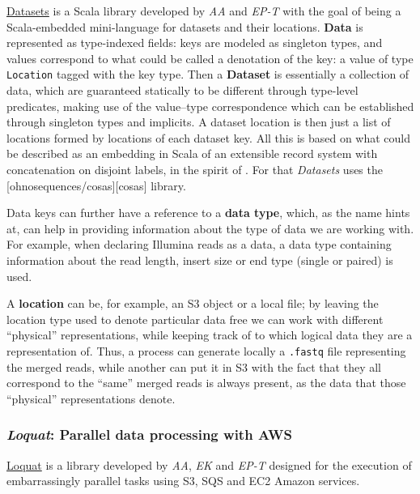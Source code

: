 \documentclass[fleqn,10pt,lineno]{wlpeerj}
\begin{document}
\protect\hyperlink{datasets}{Datasets} is a Scala library developed by
\emph{AA} and \emph{EP-T} with the goal of being a Scala-embedded
mini-language for datasets and their locations. \textbf{Data} is
represented as type-indexed fields: keys are modeled as singleton types,
and values correspond to what could be called a denotation of the key: a
value of type \texttt{Location} tagged with the key type. Then a
\textbf{Dataset} is essentially a collection of data, which are
guaranteed statically to be different through type-level predicates,
making use of the value--type correspondence which can be established
through singleton types and implicits. A dataset location is then just a
list of locations formed by locations of each dataset key. All this is
based on what could be described as an embedding in Scala of an
extensible record system with concatenation on disjoint labels, in the
spirit of \citep{harper1990extensible} \citep{harper1991record}. For
that \emph{Datasets} uses the {[}ohnosequences/cosas{]}{[}cosas{]}
library.

Data keys can further have a reference to a \textbf{data type}, which,
as the name hints at, can help in providing information about the type
of data we are working with. For example, when declaring Illumina reads
as a data, a data type containing information about the read length,
insert size or end type (single or paired) is used.

A \textbf{location} can be, for example, an S3 object or a local file;
by leaving the location type used to denote particular data free we can
work with different ``physical'' representations, while keeping track of
to which logical data they are a representation of. Thus, a process can
generate locally a \texttt{.fastq} file representing the merged reads,
while another can put it in S3 with the fact that they all correspond to
the ``same'' merged reads is always present, as the data that those
``physical'' representations denote.

\subsubsection{\texorpdfstring{\emph{Loquat}: Parallel data processing
with
AWS}{Loquat: Parallel data processing with AWS}}\label{loquat-parallel-data-processing-with-aws}

\protect\hyperlink{loquat}{Loquat} is a library developed by \emph{AA},
\emph{EK} and \emph{EP-T} designed for the execution of embarrassingly
parallel tasks using S3, SQS and EC2 Amazon services.
\end{document}

